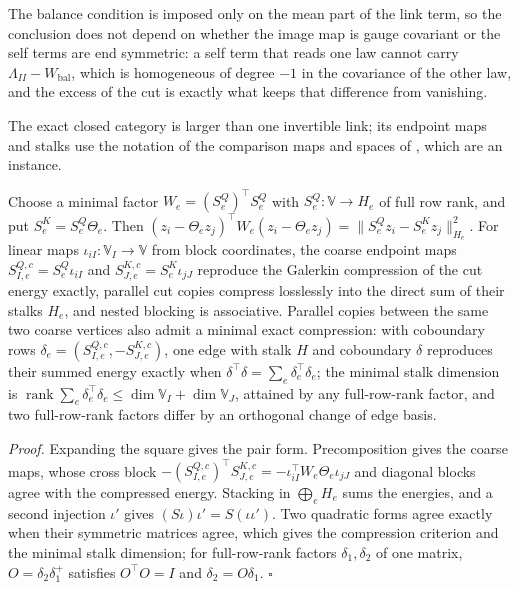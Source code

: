 The balance condition is imposed only on the mean part of the link term, so the conclusion does not depend on
whether the image map is gauge covariant or the self terms are end symmetric: a self term that reads one law
cannot carry $\Lambda_{II}-W_{\mathrm{bal}}$, which is homogeneous of degree $-1$ in the covariance of the other
law, and the excess of the cut is exactly what keeps that difference from vanishing.

The exact closed category is larger than one invertible link; its endpoint maps and stalks use the notation
of the comparison maps and spaces of , which are an instance.

Choose a minimal factor $W_e=(S^Q_e)^\top S^Q_e$ with $S^Q_e:\mathbb V\to H_e$ of full row rank, and put
$S^K_e=S^Q_e\Theta_e$. Then
$(z_i-\Theta_ez_j)^\top W_e(z_i-\Theta_ez_j)=\lVert S^Q_ez_i-S^K_ez_j\rVert^2_{H_e}$. For linear maps
$\iota_{iI}:\mathbb V_I\to \mathbb V$ from block coordinates, the coarse endpoint maps $S^{Q,c}_{I,e}=S^Q_e\iota_{iI}$ and
$S^{K,c}_{J,e}=S^K_e\iota_{jJ}$ reproduce the Galerkin compression of the cut energy exactly, parallel cut
copies compress losslessly into the direct sum of their stalks $H_e$, and nested blocking is associative.
Parallel copies between the same two coarse vertices also admit a minimal exact compression: with
coboundary rows $\delta_e=(S^{Q,c}_{I,e},-S^{K,c}_{J,e})$, one edge with stalk $H$ and coboundary $\delta$
reproduces their summed energy exactly when $\delta^\top\delta=\sum_e\delta_e^\top\delta_e$; the minimal stalk
dimension is $\operatorname{rank}\sum_e\delta_e^\top\delta_e\leq\dim \mathbb V_I+\dim \mathbb V_J$, attained by any
full-row-rank factor, and two full-row-rank factors differ by an orthogonal change of edge basis.

\noindent\emph{Proof.}
Expanding the square gives the pair form. Precomposition gives the coarse maps, whose cross block
$-(S^{Q,c}_{I,e})^\top S^{K,c}_{J,e}=-\iota_{iI}^\top W_e\Theta_e\iota_{jJ}$ and diagonal blocks agree with the
compressed energy. Stacking in $\bigoplus_eH_e$ sums the energies, and a second injection $\iota'$ gives
$(S\iota)\iota'=S(\iota\iota')$. Two quadratic forms agree exactly when their symmetric matrices agree, which
gives the compression criterion and the minimal stalk dimension; for full-row-rank factors
$\delta_1,\delta_2$ of one matrix, $O=\delta_2\delta_1^+$ satisfies $O^\top O=I$ and $\delta_2=O\delta_1$.
$\square$

